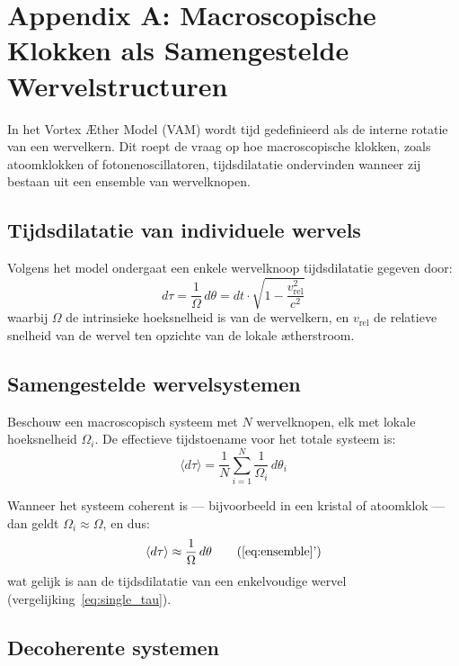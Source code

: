 \section*{Appendix A: Macroscopische Klokken als Samengestelde Wervelstructuren}
\label{appendix:KlokkenInWervelstructuren}

In het Vortex Æther Model (VAM) wordt tijd gedefinieerd als de interne rotatie van een wervelkern. Dit roept de vraag op hoe macroscopische klokken, zoals atoomklokken of fotonenoscillatoren, tijdsdilatatie ondervinden wanneer zij bestaan uit een ensemble van wervelknopen.

\subsection*{Tijdsdilatatie van individuele wervels}

Volgens het model ondergaat een enkele wervelknoop tijdsdilatatie gegeven door:
\begin{equation}
    d\tau = \frac{1}{\Omega} \, d\theta = dt \cdot \sqrt{1 - \frac{v_{\text{rel}}^2}{c^2}} \label{eq:single_tau}
\end{equation}
waarbij \( \Omega \) de intrinsieke hoeksnelheid is van de wervelkern, en \( v_{\text{rel}} \) de relatieve snelheid van de wervel ten opzichte van de lokale ætherstroom.

\subsection*{Samengestelde wervelsystemen}

Beschouw een macroscopisch systeem met \( N \) wervelknopen, elk met lokale hoeksnelheid \( \Omega_i \). De effectieve tijdstoename voor het totale systeem is:
\begin{equation}
    \langle d\tau \rangle = \frac{1}{N} \sum_{i=1}^{N} \frac{1}{\Omega_i} \, d\theta_i \label{eq:ensemble}
\end{equation}

Wanneer het systeem coherent is — bijvoorbeeld in een kristal of atoomklok — dan geldt \( \Omega_i \approx \Omega \), en dus:
\begin{equation}
    \langle d\tau \rangle \approx \frac{1}{\Omega} \, d\theta \tag{\ref{eq:ensemble}'}
\end{equation}
wat gelijk is aan de tijdsdilatatie van een enkelvoudige wervel (vergelijking~\ref{eq:single_tau}).

\subsection*{Decoherente systemen}

